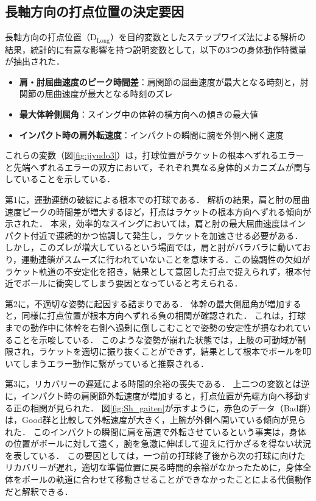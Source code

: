 \documentclass[../main]{subfiles}
\begin{document}
\subsection{長軸方向の打点位置の決定要因}
\label{subsec:tyojiku}
長軸方向の打点位置（$\mathrm{D}_{\mathrm{Long}}$）を目的変数としたステップワイズ法による解析の結果，統計的に有意な影響を持つ説明変数として，以下の3つの身体動作特徴量が抽出された．

\begin{itemize}
    \item \textbf{肩・肘屈曲速度のピーク時間差}：肩関節の屈曲速度が最大となる時刻と，肘関節の屈曲速度が最大となる時刻のズレ
    \item \textbf{最大体幹側屈角}：スイング中の体幹の横方向への傾きの最大値
    \item \textbf{インパクト時の肩外転速度}：インパクトの瞬間に腕を外側へ開く速度
\end{itemize}

これらの変数（図\ref{fig:jiyudo3}）は，打球位置がラケットの根本へずれるエラーと先端へずれるエラーの双方において，それぞれ異なる身体的メカニズムが関与していることを示している．

第1に，運動連鎖の破綻による根本での打球である．
解析の結果，肩と肘の屈曲速度ピークの時間差が増大するほど，打点はラケットの根本方向へずれる傾向が示された．
本来，効率的なスイングにおいては，肩と肘の最大屈曲速度はインパクト付近で連続的かつ協調して発生し，ラケットを加速させる必要がある．
しかし，このズレが増大しているという場面では，肩と肘がバラバラに動いており，運動連鎖がスムーズに行われていないことを意味する．この協調性の欠如がラケット軌道の不安定化を招き，結果として意図した打点で捉えられず，根本付近でボールに衝突してしまう要因となっていると考えられる．


第2に，不適切な姿勢に起因する詰まりである．
体幹の最大側屈角が増加すると，同様に打点位置が根本方向へずれる負の相関が確認された．
これは，打球までの動作中に体幹を右側へ過剰に倒しこむことで姿勢の安定性が損なわれていることを示唆している．
このような姿勢が崩れた状態では，上肢の可動域が制限され，ラケットを適切に振り抜くことができず，結果として根本でボールを叩いてしまうエラー動作に繋がっていると推察される．


第3に，リカバリーの遅延による時間的余裕の喪失である．
上二つの変数とは逆に，インパクト時の肩関節外転速度が増加すると，打点位置が先端方向へ移動する正の相関が見られた．
図\ref{fig:Sh_gaiten}が示すように，赤色のデータ（Bad群）は，Good群と比較して外転速度が大きく，上腕が外側へ開いている傾向が見られた．
このインパクトの瞬間に肩を高速で外転させているという事実は，身体の位置がボールに対して遠く，腕を急激に伸ばして迎えに行かざるを得ない状況を表している．
この要因としては，一つ前の打球終了後から次の打球に向けたリカバリーが遅れ，適切な準備位置に戻る時間的余裕がなかったために，身体全体をボールの軌道に合わせて移動させることができなかったことによる代償動作だと解釈できる．
\end{document}
